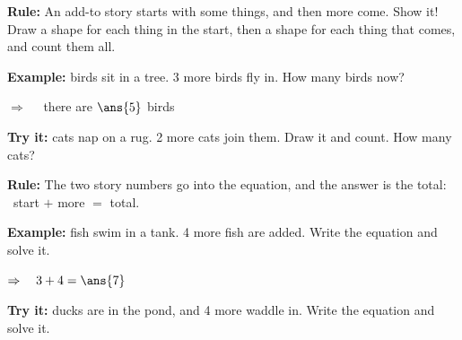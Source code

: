 \documentclass[12pt]{article}
\begin{document}


\begin{formulabox}
\textbf{Rule:} An add-to story starts with some things, and then more come.
Show it! Draw a shape for each thing in the start, then a shape for each
thing that comes, and count them all.
\end{formulabox}

\begin{examplebox}
\textbf{Example:}  birds sit in a tree. 3 more birds fly in. How many
birds now?

$\Rightarrow\quad$ there are $\ans{5}$ birds
\end{examplebox}

\begin{tryitbox}
\textbf{Try it:}  cats nap on a rug. 2 more cats join them. Draw it
and count. How many cats?\\[2pt]
\end{tryitbox}


\begin{formulabox}
\textbf{Rule:} The two story numbers go into the equation, and the answer is
the total: \ start $+$ more $=$ total.
\end{formulabox}

\begin{examplebox}
\textbf{Example:}  fish swim in a tank. 4 more fish are added. Write
the equation and solve it.

$\Rightarrow\quad 3 + 4 = \ans{7}$
\end{examplebox}

\begin{tryitbox}
\textbf{Try it:}  ducks are in the pond, and 4 more waddle in. Write
the equation and solve it.\\[2pt]
\end{tryitbox}
\end{document}
